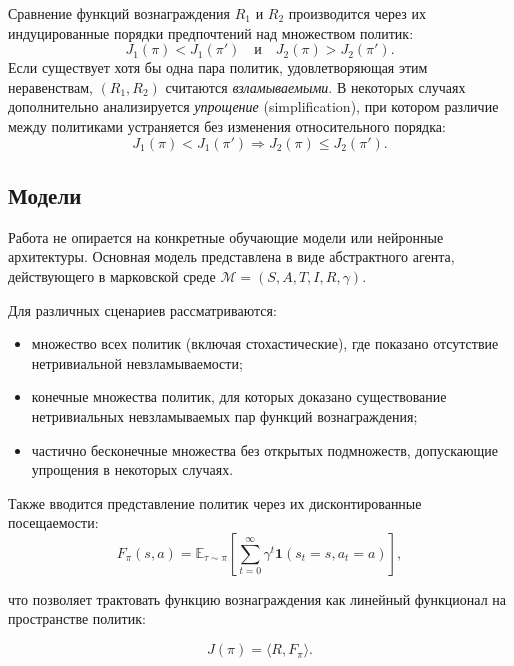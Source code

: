 Сравнение функций вознаграждения $R_1$ и $R_2$ производится через их индуцированные порядки предпочтений над множеством политик:
\begin{equation}
J_1(\pi) < J_1(\pi') \quad \text{и} \quad J_2(\pi) > J_2(\pi').
\end{equation}
Если существует хотя бы одна пара политик, удовлетворяющая этим неравенствам, $(R_1, R_2)$ считаются \emph{взламываемыми}.  
В некоторых случаях дополнительно анализируется \emph{упрощение} (simplification), при котором различие между политиками устраняется без изменения относительного порядка:
\begin{equation}
J_1(\pi) < J_1(\pi') \Rightarrow J_2(\pi) \le J_2(\pi').
\end{equation}


\subsection{Модели}

Работа не опирается на конкретные обучающие модели или нейронные архитектуры.  
Основная модель представлена в виде абстрактного агента, действующего в марковской среде $\mathcal{M} = (S, A, T, I, R, \gamma)$.  

Для различных сценариев рассматриваются:

\begin{itemize}
    \item множество всех политик (включая стохастические), где показано отсутствие нетривиальной невзламываемости;
    \item конечные множества политик, для которых доказано существование нетривиальных невзламываемых пар функций вознаграждения;
    \item частично бесконечные множества без открытых подмножеств, допускающие упрощения в некоторых случаях.
\end{itemize}

Также вводится представление политик через их дисконтированные посещаемости:
\begin{equation}
F_\pi(s,a) = \mathbb{E}_{\tau \sim \pi}\left[\sum_{t=0}^{\infty} \gamma^t \mathbf{1}(s_t = s, a_t = a)\right],
\end{equation}

что позволяет трактовать функцию вознаграждения как линейный функционал на пространстве политик:

\begin{equation}
J(\pi) = \langle R, F_\pi \rangle.
\end{equation}

